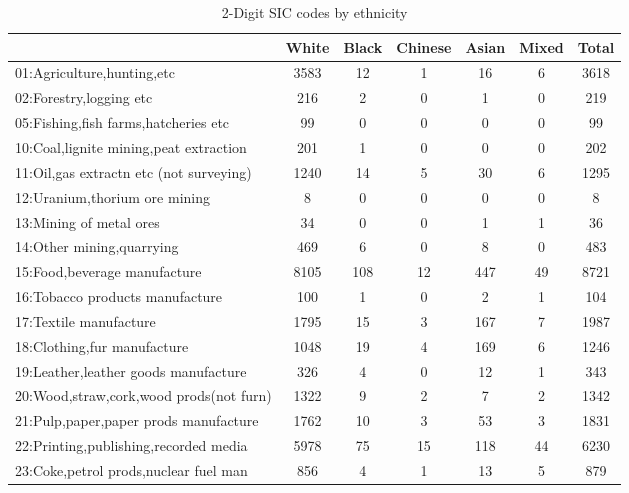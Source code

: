 {
\def\sym#1{\ifmmode^{#1}\else\(^{#1}\)\fi}
\begin{longtable}{l*{6}{c}}
\caption{2-Digit SIC codes by ethnicity}\\
\hline\hline\endfirsthead\hline\endhead\hline\endfoot\endlastfoot
          &    White&    Black&  Chinese&    Asian&    Mixed&    Total\\
\hline
01:Agriculture,hunting,etc&     3583&       12&        1&       16&        6&     3618\\
02:Forestry,logging etc&      216&        2&        0&        1&        0&      219\\
05:Fishing,fish farms,hatcheries etc&       99&        0&        0&        0&        0&       99\\
10:Coal,lignite mining,peat extraction&      201&        1&        0&        0&        0&      202\\
11:Oil,gas extractn etc (not surveying)&     1240&       14&        5&       30&        6&     1295\\
12:Uranium,thorium ore mining&        8&        0&        0&        0&        0&        8\\
13:Mining of metal ores&       34&        0&        0&        1&        1&       36\\
14:Other mining,quarrying&      469&        6&        0&        8&        0&      483\\
15:Food,beverage manufacture&     8105&      108&       12&      447&       49&     8721\\
16:Tobacco products manufacture&      100&        1&        0&        2&        1&      104\\
17:Textile manufacture&     1795&       15&        3&      167&        7&     1987\\
18:Clothing,fur manufacture&     1048&       19&        4&      169&        6&     1246\\
19:Leather,leather goods manufacture&      326&        4&        0&       12&        1&      343\\
20:Wood,straw,cork,wood prods(not furn)&     1322&        9&        2&        7&        2&     1342\\
21:Pulp,paper,paper prods manufacture&     1762&       10&        3&       53&        3&     1831\\
22:Printing,publishing,recorded media&     5978&       75&       15&      118&       44&     6230\\
23:Coke,petrol prods,nuclear fuel man&      856&        4&        1&       13&        5&      879\\

\end{longtable}}
